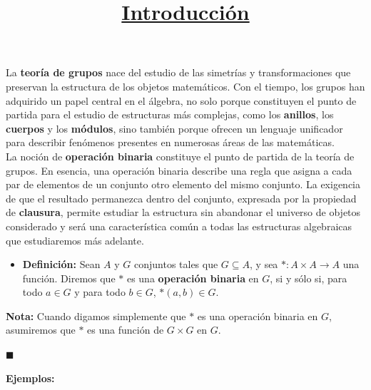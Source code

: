 \documentclass[10 pt]{article}
\title{\textbf{\underline{Introducción}}}
\author{}
\date{}
\begin{document}
\pagestyle{empty}
\maketitle
\thispagestyle{empty}

\section*{}

\Large{La \textbf{teoría de grupos} nace del estudio de las simetrías y transformaciones que preservan la estructura de los objetos matemáticos. Con el tiempo, los grupos han adquirido un papel central en el álgebra, no solo porque constituyen el punto de partida para el estudio de estructuras más complejas, como los \textbf{anillos}, los \textbf{cuerpos} y los \textbf{módulos}, sino también porque ofrecen un lenguaje unificador para describir fenómenos presentes en numerosas áreas de las matemáticas.} \\

\Large{La noción de \textbf{operación binaria} constituye el punto de partida de la teoría de grupos. En esencia, una operación binaria describe una regla que asigna a cada par de elementos de un conjunto otro elemento del mismo conjunto. La exigencia de que el resultado permanezca dentro del conjunto, expresada por la propiedad de\textbf{ clausura}, permite estudiar la estructura sin abandonar el universo de objetos considerado y será una característica común a todas las estructuras algebraicas que estudiaremos más adelante.} \\

\begin{itemize}
    \item \Large{\textbf{Definición:} Sean $A$ y $G$ conjuntos tales que $G \subseteq A$, y sea $*:A \times A \rightarrow A$ una función. Diremos que $*$ es una \textbf{operación binaria} en $G$, si y sólo si, para todo $a \in G$ y para todo $b \in G$, $*(a,b) \in G$.} \\
\end{itemize}

\Large{\textbf{Nota:} Cuando digamos simplemente que $*$ es una operación binaria en $G$, asumiremos que $*$ es una función de $G\times G$ en $G$.} \\

\begin{flushright}
   $\blacksquare$
\end{flushright}

\Large{\textbf{Ejemplos:}} \\
\end{document}

